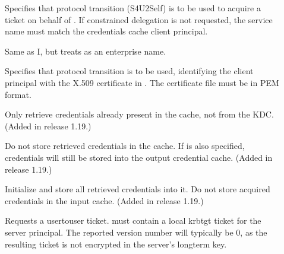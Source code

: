\documentclass[letterpaper,10pt,english]{sphinxmanual}
\begin{document}
\begin{description}
\item[{ }] \leavevmode
\sphinxAtStartPar
Specifies that protocol transition (S4U2Self) is to be used to
acquire a ticket on behalf of .  If constrained
delegation is not requested, the service name must match the
credentials cache client principal.

\item[{ }] \leavevmode
\sphinxAtStartPar
Same as \sphinxhyphen{}I, but treats  as an enterprise name.

\item[{ }] \leavevmode
\sphinxAtStartPar
Specifies that protocol transition is to be used, identifying the
client principal with the X.509 certificate in .  The
certificate file must be in PEM format.

\item[{}] \leavevmode
\sphinxAtStartPar
Only retrieve credentials already present in the cache, not from
the KDC.  (Added in release 1.19.)

\item[{}] \leavevmode
\sphinxAtStartPar
Do not store retrieved credentials in the cache.  If
 is also specified, credentials will still be
stored into the output credential cache.  (Added in release 1.19.)

\item[{ }] \leavevmode
\sphinxAtStartPar
Initialize  and store all retrieved credentials into it.
Do not store acquired credentials in the input cache.  (Added in
release 1.19.)

\item[{ }] \leavevmode
\sphinxAtStartPar
Requests a user\sphinxhyphen{}to\sphinxhyphen{}user ticket.   must contain a local
krbtgt ticket for the server principal.  The reported version
number will typically be 0, as the resulting ticket is not
encrypted in the server’s long\sphinxhyphen{}term key.

\end{description}
\end{document}
